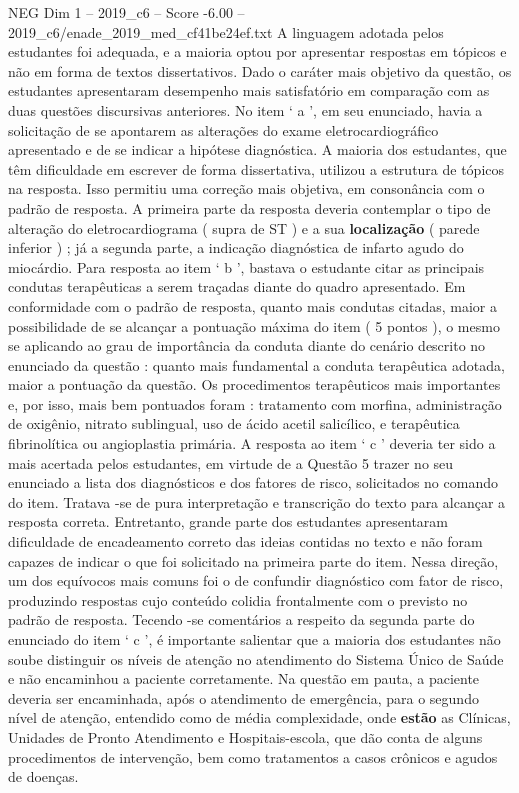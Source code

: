 \begin{textsample}{NEG Dim 1 – 2019\_c6 – Score -6.00 – 2019\_c6/enade\_2019\_med\_cf41be24ef.txt}
A linguagem adotada pelos estudantes foi adequada, e a maioria optou por apresentar respostas em tópicos e não em forma de textos dissertativos.
Dado o caráter mais objetivo da questão, os estudantes apresentaram desempenho mais satisfatório em comparação com as duas questões discursivas anteriores.
No item ‘ a ’, em seu enunciado, havia a solicitação de se apontarem as alterações do exame eletrocardiográfico apresentado e de se indicar a hipótese diagnóstica.
A maioria dos estudantes, que têm dificuldade em escrever de forma dissertativa, utilizou a estrutura de tópicos na resposta.
Isso permitiu uma correção mais objetiva, em consonância com o padrão de resposta.
A primeira parte da resposta deveria contemplar o tipo de alteração do eletrocardiograma ( supra de ST ) e a sua \textbf{localização} ( parede inferior ) ; já a segunda parte, a indicação diagnóstica de infarto agudo do miocárdio.
Para resposta ao item ‘ b ’, bastava o estudante citar as principais condutas terapêuticas a serem traçadas diante do quadro apresentado.
Em conformidade com o padrão de resposta, quanto mais condutas citadas, maior a possibilidade de se alcançar a pontuação máxima do item ( 5 pontos ), o mesmo se aplicando ao grau de importância da conduta diante do cenário descrito no enunciado da questão : quanto mais fundamental a conduta terapêutica adotada, maior a pontuação da questão.
Os procedimentos terapêuticos mais importantes e, por isso, mais bem pontuados foram : tratamento com morfina, administração de oxigênio, nitrato sublingual, uso de ácido acetil salicílico, e terapêutica fibrinolítica ou angioplastia primária.
A resposta ao item ‘ c ’ deveria ter sido a mais acertada pelos estudantes, em virtude de a Questão 5 trazer no seu enunciado a lista dos diagnósticos e dos fatores de risco, solicitados no comando do item.
Tratava -se de pura interpretação e transcrição do texto para alcançar a resposta correta.
Entretanto, grande parte dos estudantes apresentaram dificuldade de encadeamento correto das ideias contidas no texto e não foram capazes de indicar o que foi solicitado na primeira parte do item.
Nessa direção, um dos equívocos mais comuns foi o de confundir diagnóstico com fator de risco, produzindo respostas cujo conteúdo colidia frontalmente com o previsto no padrão de resposta.
Tecendo -se comentários a respeito da segunda parte do enunciado do item ‘ c ’, é importante salientar que a maioria dos estudantes não soube distinguir os níveis de atenção no atendimento do Sistema Único de Saúde e não encaminhou a paciente corretamente.
Na questão em pauta, a paciente deveria ser encaminhada, após o atendimento de emergência, para o segundo nível de atenção, entendido como de média complexidade, onde \textbf{estão} as Clínicas, Unidades de Pronto Atendimento e Hospitais-escola, que dão conta de alguns procedimentos de intervenção, bem como tratamentos a casos crônicos e agudos de doenças.

\end{textsample}

